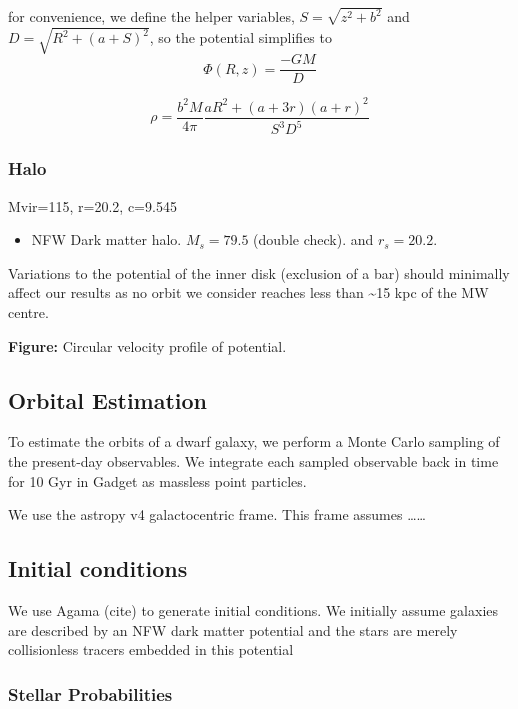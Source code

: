 for convenience, we define the helper variables,
\(S = \sqrt{z^2 + b^2}\) and \(D = \sqrt{R^2 + (a+S)^2}\), so the
potential simplifies to \[
\Phi(R, z) = \frac{-GM}{D}
\]

\[
\rho = \frac{b^2 M}{4\pi} \frac{aR^2 + (a+3r)(a + r)^2}{S^3 D^5}
\]

\subsubsection{Halo}\label{halo}

Mvir=115, r=20.2, c=9.545

\begin{itemize}
\tightlist
\item
  NFW Dark matter halo. \(M_s=79.5\) (double check). and \(r_s = 20.2\).
\end{itemize}

Variations to the potential of the inner disk (exclusion of a bar)
should minimally affect our results as no orbit we consider reaches less
than \textasciitilde15 kpc of the MW centre.

\textbf{Figure:} Circular velocity profile of \citet{EP2020} potential.

\subsection{Orbital Estimation}\label{orbital-estimation}

To estimate the orbits of a dwarf galaxy, we perform a Monte Carlo
sampling of the present-day observables. We integrate each sampled
observable back in time for 10 Gyr in Gadget as massless point
particles.

We use the astropy v4 galactocentric frame. This frame assumes
\ldots\ldots{}

\subsection{Initial conditions}\label{initial-conditions}

We use Agama (cite) to generate initial conditions. We initially assume
galaxies are described by an NFW dark matter potential and the stars are
merely collisionless tracers embedded in this potential

\subsubsection{Stellar Probabilities}\label{stellar-probabilities}

